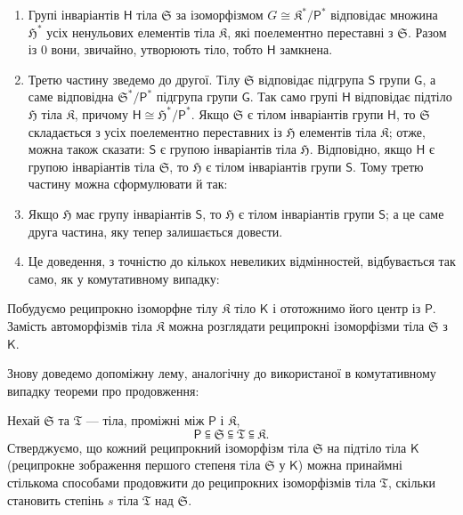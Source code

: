 \documentclass[11pt]{article}
\begin{document}
\begin{enumerate}
\item Групі інваріантів \(\mathsf{H}\) тіла \(\mathfrak S\) за ізоморфізмом \(G\cong \mathfrak K^*/\mathsf P^*\) відповідає множина \(\mathfrak H^*\) усіх ненульових елементів тіла \(\mathfrak K\), які поелементно переставні з \(\mathfrak S\). Разом із 0 вони, звичайно, утворюють тіло, тобто \(\mathsf{H}\) замкнена.

\item Третю частину зведемо до другої. Тілу \(\mathfrak S\) відповідає підгрупа \(\mathsf{S}\) групи \(\mathsf{G}\), а саме відповідна \(\mathfrak S^*/\mathsf P^*\) підгрупа групи \(\mathsf{G}\). Так само групі \(\mathsf{H}\) відповідає підтіло \(\mathfrak H\) тіла \(\mathfrak K\), причому \(\mathsf{H}\cong \mathfrak H^*/\mathsf P^*\). Якщо \(\mathfrak S\) є тілом інваріантів групи \(\mathsf{H}\), то \(\mathfrak S\) складається з усіх поелементно переставних із \(\mathfrak H\) елементів тіла \(\mathfrak K\); отже, можна також сказати: \(\mathsf{S}\) є групою інваріантів тіла \(\mathfrak H\). Відповідно, якщо \(\mathsf{H}\) є групою інваріантів тіла \(\mathfrak S\), то \(\mathfrak H\) є тілом інваріантів групи \(\mathsf{S}\). Тому третю частину можна сформулювати й так:

\item[\(3'\).] Якщо \(\mathfrak H\) має групу інваріантів \(\mathsf{S}\), то \(\mathfrak H\) є тілом інваріантів групи \(\mathsf{S}\); а це саме друга частина, яку тепер залишається довести.

\item[3.] Це доведення, з точністю до кількох невеликих відмінностей, відбувається так само, як у комутативному випадку:
\end{enumerate}

Побудуємо реципрокно ізоморфне тілу \(\mathfrak K\) тіло \(\mathsf{K}\) і ототожнимо його центр із \(\mathsf P\). Замість автоморфізмів тіла \(\mathfrak K\) можна розглядати реципрокні ізоморфізми тіла \(\mathfrak S\) з \(\mathsf{K}\).

Знову доведемо допоміжну лему, аналогічну до використаної в комутативному випадку теореми про продовження:

Нехай \(\mathfrak S\) та \(\mathfrak T\) --- тіла, проміжні між \(\mathsf P\) і \(\mathfrak K\),
\[
\mathsf P \subseteqq \mathfrak S \subseteqq \mathfrak T \subseteqq \mathfrak K.
\]
Стверджуємо, що кожний реципрокний ізоморфізм тіла \(\mathfrak S\) на підтіло тіла \(\mathsf{K}\) (реципрокне зображення першого степеня тіла \(\mathfrak S\) у \(\mathsf{K}\)) можна принаймні стількома способами продовжити до реципрокних ізоморфізмів тіла \(\mathfrak T\), скільки становить степінь \(s\) тіла \(\mathfrak T\) над \(\mathfrak S\).
\end{document}

